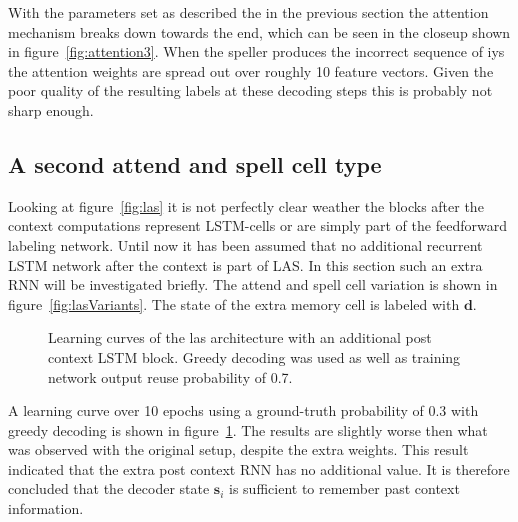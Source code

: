 With the parameters set as described the in the previous section the attention mechanism breaks down towards the end, which can be seen in the closeup shown in figure~\ref{fig:attention3}. When the speller produces the incorrect sequence of iys the attention weights are spread out over roughly 10 feature vectors. Given the poor quality of the resulting labels at these decoding steps this is probably not sharp enough.


\subsection{A second attend and spell cell type}
Looking at figure~\ref{fig:las} it is not perfectly clear weather the blocks after the context computations represent LSTM-cells or are simply part of the feedforward labeling network. Until now it has been assumed that no additional recurrent LSTM network after the context is part of LAS. In this section such an extra RNN will be investigated briefly. 
The attend and spell cell variation is shown in figure~\ref{fig:lasVariants}. The state of the extra memory cell is labeled with $\mathbf{d}$.
\begin{figure}
\centering


\caption{Learning curves of the las architecture with an additional post context LSTM block. Greedy decoding was used as well as training network output reuse probability of 0.7.}
\label{fig:variantResult}
\end{figure}
A learning curve over 10 epochs using a ground-truth probability of 0.3 with greedy decoding is shown in figure~\ref{fig:variantResult}. The results are slightly worse then what was observed with the original setup, despite the extra weights. This result indicated that the extra post context RNN has no additional value.
It is therefore concluded that the decoder state $\mathbf{s}_i$ is sufficient to remember past context information.


